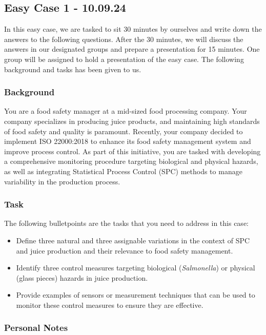 \subsection{Easy Case 1 - 10.09.24}
In this easy case, we are tasked to sit 30 minutes by ourselves and write down the answers to the following questions. After the 30 minutes, we will discuss the answers in our designated groups and prepare a presentation for 15 minutes. One group will be assigned to hold a presentation of the easy case. The following background and tasks has been given to us.

\subsubsection*{Background}
You are a food safety manager at a mid-sized food processing company. Your company specializes in producing juice products, and maintaining high standards of food safety and quality is paramount. Recently, your company decided to implement ISO 22000:2018 to enhance its food safety management system and improve process control. As part of this initiative, you are tasked with developing a comprehensive monitoring procedure targeting biological and physical hazards, as well as integrating Statistical Process Control (SPC) methods to manage variability in the production process.

\subsubsection*{Task}
The following bulletpoints are the tasks that you need to address in this case:
\begin{itemize}
    \item Define three natural and three assignable variations in the context of SPC and juice production and their relevance to food safety management.
    \item Identify three control measures targeting biological (\textit{Salmonella}) or physical (glass pieces) hazards in juice production.
    \item Provide examples of sensors or measurement techniques that can be used to monitor these control measures to ensure they are effective.
\end{itemize}

\subsubsection*{Personal Notes}

